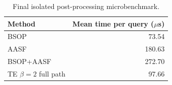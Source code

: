 \begin{table}[t]
\centering
\caption{Final isolated post-processing microbenchmark.}
\label{tab:postprocessing-timing}
\begin{tabular}{lr}
\toprule
Method & Mean time per query ($\mu$s) \\
\midrule
BSOP & 73.54 \\
AASF & 180.63 \\
BSOP+AASF & 272.70 \\
TE $\beta=2$ full path & 97.66 \\
\bottomrule
\end{tabular}
\end{table}

